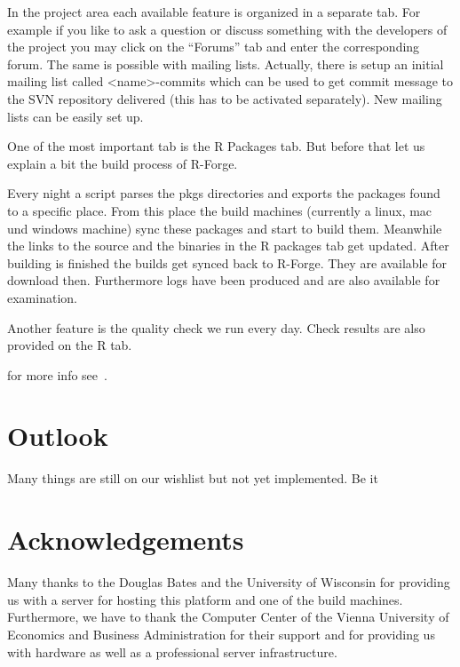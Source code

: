 In the project area each available feature is organized in a separate
tab. For example if you like to ask a question or discuss something
with the developers of the project you may click on the ``Forums'' tab
and enter the corresponding forum. The same is possible with mailing
lists. Actually, there is setup an initial mailing list called
<name>-commits which can be used to get commit message to the SVN
repository delivered (this has to be activated separately). New
mailing lists can be easily set up.

One of the most important tab is the R Packages tab. But before that
let us explain a bit the build process of R-Forge.

Every night a script parses the pkgs directories and exports the
packages found to a specific place. From this place the build machines
(currently a linux, mac und windows machine) sync these packages and
start to build them. Meanwhile the links to the source and the
binaries in the R packages tab get updated. After building is finished
the builds get synced back to R-Forge. They are available for download
then. Furthermore logs have been produced and are also available for
examination.

Another feature is the quality check we run every day. Check results
are also provided on the R tab.


for more info see~\cite{theussl07:r_forge_users_manual}.

\section*{Outlook}

Many things are still on our wishlist but not yet implemented. Be it 

\section{Acknowledgements}

Many thanks to the Douglas Bates and the University of Wisconsin
for providing us with a server for hosting this platform and one of
the build machines. Furthermore, we have to thank the Computer Center
of the Vienna University of Economics and Business Administration for
their support and for providing us with hardware as well as a
professional server infrastructure.

